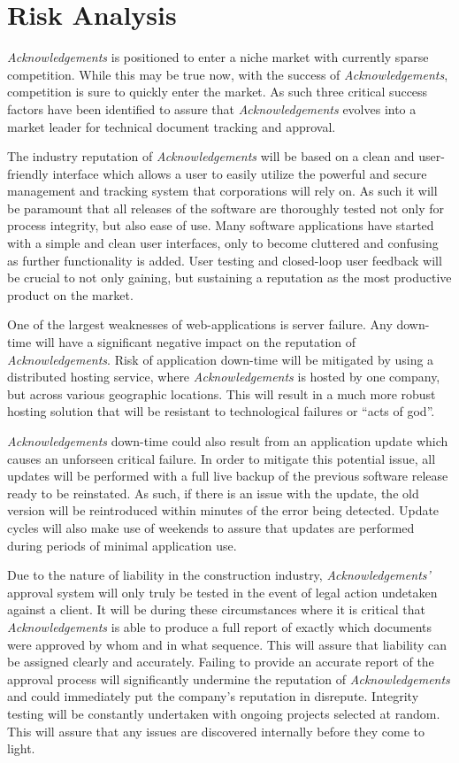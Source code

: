 \section{Risk Analysis}

{\it Acknowledgements} is positioned to enter a niche market with currently sparse competition. While this may be true now, with the success of {\it Acknowledgements}, competition is sure to quickly enter the market. As such three critical success factors have been identified to assure that {\it Acknowledgements} evolves into a market leader for technical document tracking and approval.

The industry reputation of {\it Acknowledgements} will be based on a clean and user-friendly interface which allows a user to easily utilize the powerful and secure management and tracking system that corporations will rely on. As such it will be paramount that all releases of the software are thoroughly tested not only for process integrity, but also ease of use. Many software applications have started with a simple and clean user interfaces, only to become cluttered and confusing as further functionality is added. User testing and closed-loop user feedback will be crucial to not only gaining, but sustaining a reputation as the most productive product on the market.

One of the largest weaknesses of web-applications is server failure. Any down-time will have a significant negative impact on the reputation of {\it Acknowledgements}. Risk of application down-time will be mitigated by using a distributed hosting service, where {\it Acknowledgements} is hosted by one company, but across various geographic locations. This will result in a much more robust hosting solution that will be resistant to technological failures or ``acts of god''. 

{\it Acknowledgements} down-time could also result from an application update which causes an unforseen critical failure. In order to mitigate this potential issue, all updates will be performed with a full live backup of the previous software release ready to be reinstated. As such, if there is an issue with the update, the old version will be reintroduced within minutes of the error being detected. Update cycles will also make use of weekends to assure that updates are performed during periods of minimal application use.

Due to the nature of liability in the construction industry, {\it Acknowledgements'} approval system will only truly be tested in the event of legal action undetaken against a client. It will be during these circumstances where it is critical that {\it Acknowledgements} is able to produce a full report of exactly which documents were approved by whom and in what sequence. This will assure that liability can be assigned clearly and accurately. Failing to provide an accurate report of the approval process will significantly undermine the reputation of {\it Acknowledgements} and could immediately put the company's reputation in disrepute. Integrity testing will be constantly undertaken with ongoing projects selected at random. This will assure that any issues are discovered internally before they come to light.

